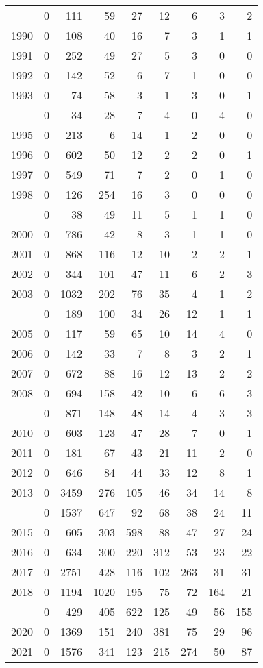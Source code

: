 \documentclass[
]{article}
\begin{document}
\begin{longtable}[t]{lrrrrrrrr}
\endfoot
\bottomrule
\endlastfoot
1989 & 0 & 111 & 59 & 27 & 12 & 6 & 3 & 2\\
1990 & 0 & 108 & 40 & 16 & 7 & 3 & 1 & 1\\
1991 & 0 & 252 & 49 & 27 & 5 & 3 & 0 & 0\\
1992 & 0 & 142 & 52 & 6 & 7 & 1 & 0 & 0\\
1993 & 0 & 74 & 58 & 3 & 1 & 3 & 0 & 1\\
\addlinespace
1994 & 0 & 34 & 28 & 7 & 4 & 0 & 4 & 0\\
1995 & 0 & 213 & 6 & 14 & 1 & 2 & 0 & 0\\
1996 & 0 & 602 & 50 & 12 & 2 & 2 & 0 & 1\\
1997 & 0 & 549 & 71 & 7 & 2 & 0 & 1 & 0\\
1998 & 0 & 126 & 254 & 16 & 3 & 0 & 0 & 0\\
\addlinespace
1999 & 0 & 38 & 49 & 11 & 5 & 1 & 1 & 0\\
2000 & 0 & 786 & 42 & 8 & 3 & 1 & 1 & 0\\
2001 & 0 & 868 & 116 & 12 & 10 & 2 & 2 & 1\\
2002 & 0 & 344 & 101 & 47 & 11 & 6 & 2 & 3\\
2003 & 0 & 1032 & 202 & 76 & 35 & 4 & 1 & 2\\
\addlinespace
2004 & 0 & 189 & 100 & 34 & 26 & 12 & 1 & 1\\
2005 & 0 & 117 & 59 & 65 & 10 & 14 & 4 & 0\\
2006 & 0 & 142 & 33 & 7 & 8 & 3 & 2 & 1\\
2007 & 0 & 672 & 88 & 16 & 12 & 13 & 2 & 2\\
2008 & 0 & 694 & 158 & 42 & 10 & 6 & 6 & 3\\
\addlinespace
2009 & 0 & 871 & 148 & 48 & 14 & 4 & 3 & 3\\
2010 & 0 & 603 & 123 & 47 & 28 & 7 & 0 & 1\\
2011 & 0 & 181 & 67 & 43 & 21 & 11 & 2 & 0\\
2012 & 0 & 646 & 84 & 44 & 33 & 12 & 8 & 1\\
2013 & 0 & 3459 & 276 & 105 & 46 & 34 & 14 & 8\\
\addlinespace
2014 & 0 & 1537 & 647 & 92 & 68 & 38 & 24 & 11\\
2015 & 0 & 605 & 303 & 598 & 88 & 47 & 27 & 24\\
2016 & 0 & 634 & 300 & 220 & 312 & 53 & 23 & 22\\
2017 & 0 & 2751 & 428 & 116 & 102 & 263 & 31 & 31\\
2018 & 0 & 1194 & 1020 & 195 & 75 & 72 & 164 & 21\\
\addlinespace
2019 & 0 & 429 & 405 & 622 & 125 & 49 & 56 & 155\\
2020 & 0 & 1369 & 151 & 240 & 381 & 75 & 29 & 96\\
2021 & 0 & 1576 & 341 & 123 & 215 & 274 & 50 & 87\\*
\end{longtable}
\end{document}

